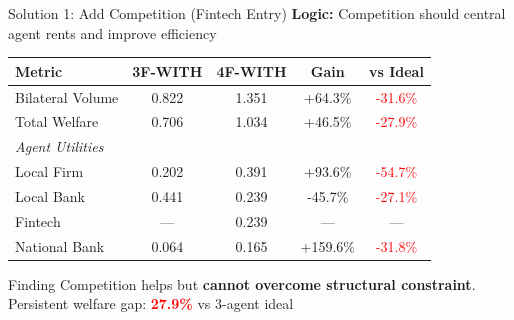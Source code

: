 \documentclass[aspectratio=169]{beamer}
\begin{document}
\begin{frame}{Solution 1: Add Competition (Fintech Entry)}
    \textbf{Logic:} Competition should central agent rents and improve efficiency
    
    \vspace{0.3cm}
    \begin{table}
        \centering
        \small
        \begin{tabular}{lcccc}
            \toprule
            \textbf{Metric} & \textbf{3F-WITH} & \textbf{4F-WITH} & \textbf{Gain} & \textbf{vs Ideal} \\
            \midrule
            Bilateral Volume & 0.822 & 1.351 & +64.3\% & \textcolor{red}{-31.6\%} \\
            Total Welfare & 0.706 & 1.034 & +46.5\% & \textcolor{red}{-27.9\%} \\
            \midrule
            \textit{Agent Utilities} \\
            Local Firm & 0.202 & 0.391 & +93.6\% & \textcolor{red}{-54.7\%} \\
            Local Bank & 0.441 & 0.239 & -45.7\% & \textcolor{red}{-27.1\%} \\
            Fintech & --- & 0.239 & --- & --- \\
            National Bank & 0.064 & 0.165 & +159.6\% & \textcolor{red}{-31.8\%} \\
            \bottomrule
        \end{tabular}
    \end{table}
    
    \vspace{0.3cm}
    \begin{alertblock}{Finding}
        Competition helps but \textbf{cannot overcome structural constraint}. \\
        Persistent welfare gap: \textcolor{red}{\textbf{27.9\%}} vs 3-agent ideal
    \end{alertblock}
\end{frame}
\end{document}
